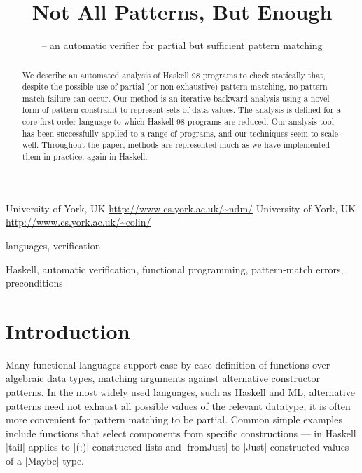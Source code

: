 \documentclass[preprint]{sigplanconf}
\begin{document}
\copyrightdata{[to be supplied]}

\titlebanner{} %
\preprintfooter{}   %

\title{Not All Patterns, But Enough}
\subtitle{ -- an automatic verifier for partial but sufficient pattern matching}

           {University of York, UK}
           {\url{http://www.cs.york.ac.uk/~ndm/}}
           {University of York, UK}
           {\url{http://www.cs.york.ac.uk/~colin/}}

\maketitle

\begin{abstract}
We describe an automated analysis of Haskell 98 programs to check
statically that, despite the possible use of partial (or non-exhaustive)
pattern matching, no pattern-match failure can occur.  Our method is an
iterative backward analysis using a novel form of pattern-constraint
to represent sets of data values.  The analysis is defined for a
core first-order language to which Haskell 98 programs are reduced.
Our analysis tool has been successfully applied to a range of programs,
and our techniques seem to scale well.  Throughout the paper, methods
are represented much as we have implemented them in practice, again in Haskell.
\end{abstract}


\terms
languages, verification

\keywords
Haskell, automatic verification, functional programming, pattern-match errors, preconditions

\section{Introduction}
\label{sec:introduction}

Many functional languages support case-by-case definition of functions
over algebraic data types, matching arguments against alternative
constructor patterns.  In the most widely used languages, such as Haskell
and ML, alternative patterns need not exhaust all possible values of
the relevant datatype; it is often more convenient for pattern matching
to be partial.  Common simple examples include functions that select
components from specific constructions --- in Haskell |tail| applies
to |(:)|-constructed lists and |fromJust| to |Just|-constructed values of
a |Maybe|-type.
\end{document}
